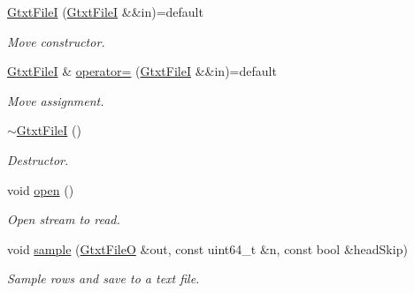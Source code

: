 \begin{DoxyCompactItemize}
\mbox{\label{classsamp_files_1_1_gtxt_file_i_a93ff32becc286112d7e1a2fc3284405c}} 
\hyperlink{classsamp_files_1_1_gtxt_file_i_a93ff32becc286112d7e1a2fc3284405c}{Gtxt\+FileI} (\hyperlink{classsamp_files_1_1_gtxt_file_i}{Gtxt\+FileI} \&\&in)=default
\begin{DoxyCompactList}\small\item\em Move constructor. \end{DoxyCompactList}\item 
\mbox{\label{classsamp_files_1_1_gtxt_file_i_a76524baf921d6550de5a8bb7748ac871}} 
\hyperlink{classsamp_files_1_1_gtxt_file_i}{Gtxt\+FileI} \& \hyperlink{classsamp_files_1_1_gtxt_file_i_a76524baf921d6550de5a8bb7748ac871}{operator=} (\hyperlink{classsamp_files_1_1_gtxt_file_i}{Gtxt\+FileI} \&\&in)=default
\begin{DoxyCompactList}\small\item\em Move assignment. \end{DoxyCompactList}\item 
\mbox{\label{classsamp_files_1_1_gtxt_file_i_ad291e4fefc01d04671a9af5429649431}} 
\hyperlink{classsamp_files_1_1_gtxt_file_i_ad291e4fefc01d04671a9af5429649431}{$\sim$\+Gtxt\+FileI} ()
\begin{DoxyCompactList}\small\item\em Destructor. \end{DoxyCompactList}\item 
\mbox{\label{classsamp_files_1_1_gtxt_file_i_a02dbd0de90315f1e59c0a5c88c13c055}} 
void \hyperlink{classsamp_files_1_1_gtxt_file_i_a02dbd0de90315f1e59c0a5c88c13c055}{open} ()
\begin{DoxyCompactList}\small\item\em Open stream to read. \end{DoxyCompactList}\item 
void \hyperlink{classsamp_files_1_1_gtxt_file_i_ae3a13c1ff7dce452859abf0942da0631}{sample} (\hyperlink{classsamp_files_1_1_gtxt_file_o}{Gtxt\+FileO} \&out, const uint64\+\_\+t \&n, const bool \&head\+Skip)
\begin{DoxyCompactList}\small\item\em Sample rows and save to a text file. \end{DoxyCompactList}\item 

\end{DoxyCompactItemize}
